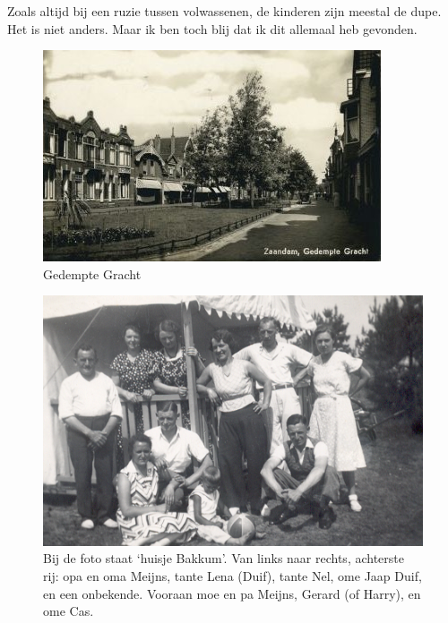 \documentclass[12pt,twoside]{memoir}
\begin{document}
Zoals altijd bij een ruzie tussen volwassenen, de kinderen zijn meestal de dupe. Het is niet anders. Maar ik ben toch blij dat ik dit allemaal heb gevonden.

\begin{figure}
\includegraphics[width=\textwidth]{img/ch2/ch2-afb11}
\caption*{\footnotesize Gedempte Gracht}
\end{figure} 

\begin{figure}
\includegraphics[width=\textwidth]{img/ch2/ch2-afb12}
\caption*{\footnotesize Bij de foto staat ‘huisje Bakkum’. Van links naar rechts, achterste rij: opa en oma Meijns, tante Lena (Duif), tante Nel, ome Jaap Duif, en een onbekende. Vooraan moe en pa Meijns, Gerard (of Harry), en ome Cas.}
\end{figure}
\end{document}
